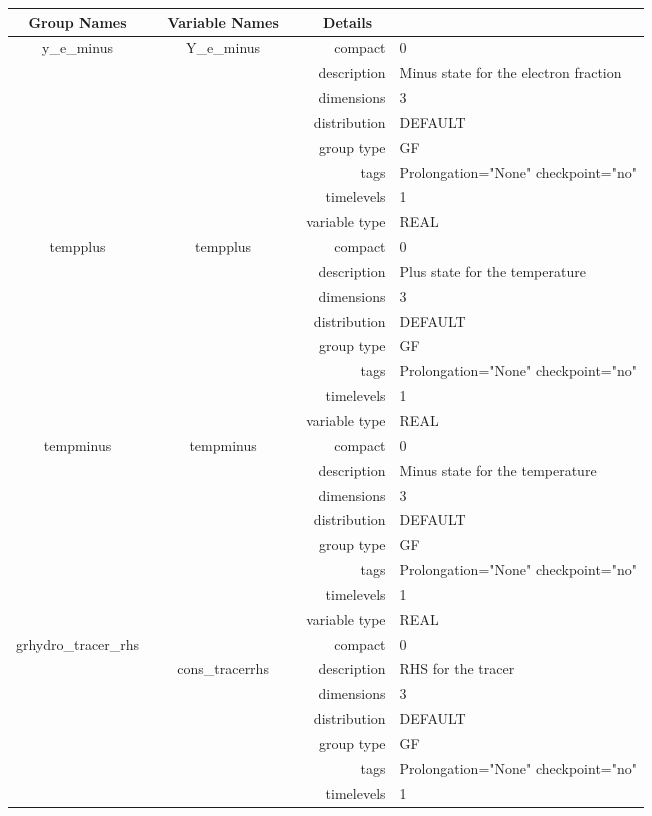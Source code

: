 \documentclass{article}
\begin{document}
\begin{tabular*}{150mm}{|c|c@{\extracolsep{\fill}}|rl|} \hline 
~ {\bf Group Names} ~ & ~ {\bf Variable Names} ~  &{\bf Details} ~ & ~ \\ 
\hline 
y\_e\_minus & Y\_e\_minus & compact & 0 \\ 
 &  & description & Minus state for the electron fraction \\ 
 &  & dimensions & 3 \\ 
 &  & distribution & DEFAULT \\ 
 &  & group type & GF \\ 
 &  & tags & Prolongation="None" checkpoint="no" \\ 
 &  & timelevels & 1 \\ 
 &  & variable type & REAL \\ 
\hline 
tempplus & tempplus & compact & 0 \\ 
 &  & description & Plus state  for the temperature \\ 
 &  & dimensions & 3 \\ 
 &  & distribution & DEFAULT \\ 
 &  & group type & GF \\ 
 &  & tags & Prolongation="None" checkpoint="no" \\ 
 &  & timelevels & 1 \\ 
 &  & variable type & REAL \\ 
\hline 
tempminus & tempminus & compact & 0 \\ 
 &  & description & Minus state for the temperature \\ 
 &  & dimensions & 3 \\ 
 &  & distribution & DEFAULT \\ 
 &  & group type & GF \\ 
 &  & tags & Prolongation="None" checkpoint="no" \\ 
 &  & timelevels & 1 \\ 
 &  & variable type & REAL \\ 
\hline 
grhydro\_tracer\_rhs &  & compact & 0 \\ 
 & cons\_tracerrhs & description & RHS for the tracer \\ 
 &  & dimensions & 3 \\ 
 &  & distribution & DEFAULT \\ 
 &  & group type & GF \\ 
 &  & tags & Prolongation="None" checkpoint="no" \\ 
 &  & timelevels & 1 \\ 

\end{tabular*}
\end{document}
